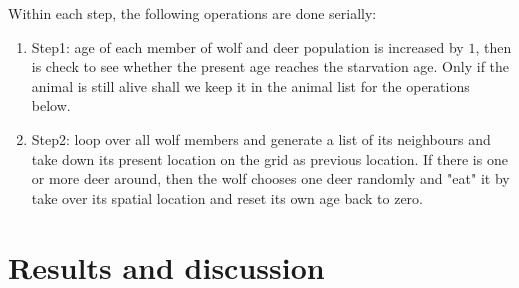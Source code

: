 \documentclass[a4paper,12pt]{article}
\begin{document}
Within each step, the following operations are done serially: 
\begin{enumerate}
\item Step1: age of each member of wolf and deer population is increased by $1$, then is check to see whether the present age reaches the starvation age. Only if the animal is still alive shall we keep it in the animal list for the operations below.
\item Step2: loop over all wolf members and generate a list of its neighbours and take down its present location on the grid as previous location. If there is one or more deer around, then the wolf chooses one deer randomly and "eat" it by take over its spatial location and reset its own age back to zero.
\end{enumerate}




\section{Results and discussion}
\end{document}
